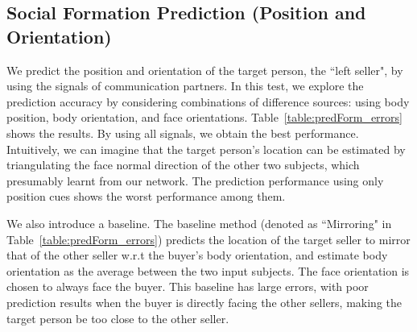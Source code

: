 \subsection{Social Formation Prediction (Position and Orientation)}
We predict the position and orientation of the target person, the ``left seller", by using the signals of communication partners. In this test, we explore the prediction accuracy by considering combinations of difference sources: using body position, body orientation, and face orientations. Table~\ref{table:predForm_errors} shows the results. By using all signals, we obtain the best performance. Intuitively, we can imagine that the target person's location can be estimated by triangulating the face normal direction of the other two subjects, which presumably learnt from our network. The prediction performance using only position cues shows the worst performance among them. 

We also introduce a baseline. The baseline method (denoted as ``Mirroring" in Table~\ref{table:predForm_errors}) predicts the location of the target seller to mirror that of the other seller w.r.t the buyer's body orientation, and estimate body orientation as the average between the two input subjects. The face orientation is chosen to always face the buyer. This baseline has large errors, with poor prediction results when the buyer is directly facing the other sellers, making the target person be too close to the other seller. 


